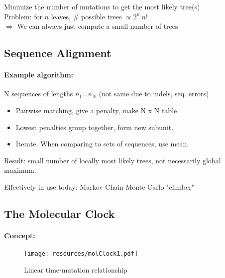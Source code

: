 \documentclass{beamer}
\begin{document}
\begin{darkframes}
\begin{frame}{\secname}
      Minimize the number of mutations to get the most likely tree(s)\\[1mm]

      Problem: for $n$ leaves, \# possible trees $\propto 2^n\ n !$\\[1mm]

      $\Rightarrow$ We can always just compute a small number of trees

    \end{frame}

    \subsection{Sequence Alignment}

    \begin{frame}{\secname}
      \framesubtitle{Example algorithm: \subsecname}

      \vfill
      N sequences of lengths $n_1 ... n_N$ (not same due to indels, seq. errors)
      \begin{itemize}
        \item Pairwise matching, give a penalty, make N x N table
        \item Lowest penalties group together, form new subunit.
        \item Iterate. When comparing to sets of sequences, use mean.
      \end{itemize}

      Result: small number of locally most likely trees, not necessarily global maximum.

      Effectively in use today: Markov Chain Monte Carlo "climber"

    \end{frame}


    \subsection{The Molecular Clock}

    \begin{frame}{\secname}
      \framesubtitle{Concept: \subsecname}
      \begin{figure}
        \texttt{[image: resources/molClock1.pdf]}
        \caption{\footnotesize Linear time-mutation relationship}
      \end{figure}
      \addtocounter{figure}{-1}
    \end{frame}



\end{darkframes}
\end{document}
